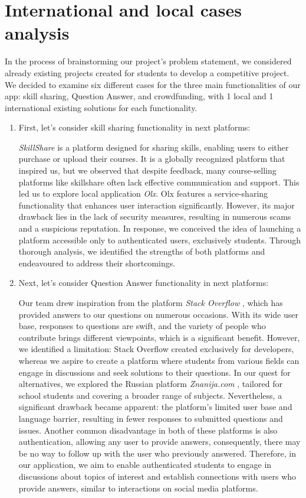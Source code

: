 \section{International and local cases analysis} \label{intandloc}

In the process of brainstorming our project's problem statement, we considered already existing projects created for students to develop a competitive project. We decided to examine six different cases for the three main functionalities of our app: skill sharing, Question Answer, and crowdfunding, with 1 local and 1 international existing solutions for each functionality.

\begin{enumerate}
    \item First, let’s consider skill sharing functionality in next platforms:

     \textit{SkillShare} is a platform designed for sharing skills, enabling users to either purchase or upload their courses. It is a globally recognized platform that inspired us, but we observed that despite feedback, many course-selling platforms like skillshare often lack effective communication and support. This led us to explore local application \textit{Olx}. Olx \cite{olx} features a service-sharing functionality that enhances user interaction significantly. However, its major drawback lies in the lack of security measures, resulting in numerous scams and a suspicious reputation. In response, we conceived the idea of launching a platform accessible only to authenticated users, exclusively students. Through thorough analysis, we identified the strengths of both platforms and endeavoured to address their shortcomings.

     \item Next, let’s consider Question Answer functionality in next platforms:

     Our team drew inspiration from the platform \textit{Stack Overflow} \cite{stackoverlow}, which has provided answers to our questions on numerous occasions. With its wide user base, responses to questions are swift, and the variety of people who contribute brings different viewpoints, which is a significant benefit. However, we identified a limitation: Stack Overflow \cite{stackoverlow} created exclusively for developers, whereas we aspire to create a platform where students from various fields can engage in discussions and seek solutions to their questions. In our quest for alternatives, we explored the Russian platform \textit{Znanija.com} \cite{znanija}, tailored for school students and covering a broader range of subjects. Nevertheless, a significant drawback became apparent: the platform's limited user base and language barrier, resulting in fewer responses to submitted questions and issues. Another common disadvantage in both of these platforms is also authentication, allowing any user to provide answers, consequently, there may be no way to follow up with the user who previously answered. Therefore, in our application, we aim to enable authenticated students to engage in discussions about topics of interest and establish connections with users who provide answers, similar to interactions on social media platforms.


\end{enumerate}
